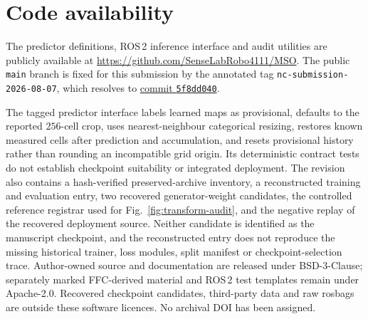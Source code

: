 \documentclass[11pt]{article}
\begin{document}
\section{Code availability}

The predictor definitions, ROS\,2 inference interface and audit utilities are publicly available at \url{https://github.com/SenseLabRobo4111/MSO}. The public \texttt{main} branch is fixed for this submission by the annotated tag \texttt{nc-submission-2026-08-07}, which resolves to \href{https://github.com/SenseLabRobo4111/MSO/tree/5f8dd040e2707ca1bfcf0acee35e0ffed0795571}{commit \texttt{5f8dd040}}.

The tagged predictor interface labels learned maps as provisional, defaults to the reported $256$-cell crop, uses nearest-neighbour categorical resizing, restores known measured cells after prediction and accumulation, and resets provisional history rather than rounding an incompatible grid origin. Its deterministic contract tests do not establish checkpoint suitability or integrated deployment. The revision also contains a hash-verified preserved-archive inventory, a reconstructed training and evaluation entry, two recovered generator-weight candidates, the controlled reference registrar used for Fig.~\ref{fig:transform-audit}, and the negative replay of the recovered deployment source. Neither candidate is identified as the manuscript checkpoint, and the reconstructed entry does not reproduce the missing historical trainer, loss modules, split manifest or checkpoint-selection trace. Author-owned source and documentation are released under BSD-3-Clause; separately marked FFC-derived material and ROS\,2 test templates remain under Apache-2.0. Recovered checkpoint candidates, third-party data and raw rosbags are outside these software licences. No archival DOI has been assigned.



\end{document}
